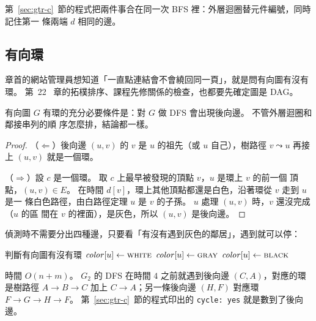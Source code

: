 第~\ref{sec:gtr-c}~節的程式把兩件事合在同一次 BFS 裡：外層迴圈替元件編號，同時記住第一
條兩端 $d$ 相同的邊。

\subsection{有向環}

章首的網站管理員想知道「一直點連結會不會繞回同一頁」，就是問有向圖有沒有環。 第~22~
章的拓樸排序、課程先修關係的檢查，也都要先確定圖是 DAG。

\begin{theorem}
\label{thm:gtr-cycle}
有向圖 $G$ 有環的充分必要條件是：對 $G$ 做 DFS 會出現後向邊。 不管外層迴圈和鄰接串列的順
序怎麼排，結論都一樣。
\end{theorem}

\begin{proof}
（$\Leftarrow$）後向邊 $(u, v)$ 的 $v$ 是 $u$ 的祖先（或 $u$ 自己），樹路徑 $v \leadsto u$
再接上 $(u, v)$ 就是一個環。

（$\Rightarrow$）設 $c$ 是一個環。 取 $c$ 上最早被發現的頂點 $v$，$u$ 是環上 $v$ 的前一個
頂點，$(u, v) \in E$。 在時間 $d[v]$，環上其他頂點都還是白色，沿著環從 $v$ 走到 $u$ 是一
條白色路徑，由白路徑定理 $u$ 是 $v$ 的子孫。 $u$ 處理 $(u, v)$ 時，$v$ 還沒完成（$u$ 的區
間在 $v$ 的裡面），是灰色，所以 $(u, v)$ 是後向邊。
\end{proof}

偵測時不需要分出四種邊，只要看「有沒有遇到灰色的鄰居」，遇到就可以停：

\begin{pseudo}[label=alg:gtr-cycle]{判斷有向圖有沒有環}
        \State $\mathit{color}[u] \gets \textsc{white}$
    \EndFor
            \State \Return \TRUE
        \EndIf
    \EndFor
    \State \Return \FALSE
\EndFunction
{} 
    \State $\mathit{color}[u] \gets \textsc{gray}$
            \State \Return \TRUE {}
        \EndIf
            \State \Return \TRUE
        \EndIf
    \EndFor
    \State $\mathit{color}[u] \gets \textsc{black}$
    \State \Return \FALSE
\EndFunction
\end{pseudo}

時間 $O(n + m)$。 $G_2$ 的 DFS 在時間 $4$ 之前就遇到後向邊 $(C, A)$，對應的環是樹路徑
$A \to B \to C$ 加上 $C \to A$；另一條後向邊 $(H, F)$ 對應環 $F \to G \to H \to F$。 第~\ref{sec:gtr-c}~節的程式印出的 \texttt{cycle: yes} 就是數到了後向邊。


